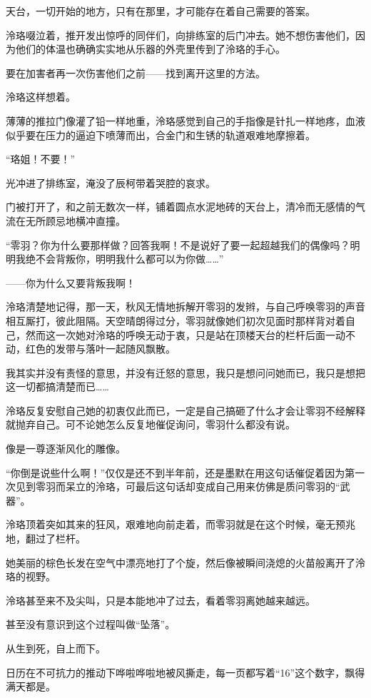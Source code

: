 \documentclass[UTF8, scheme = chinese, openany]{ctexbook}
\begin{document}
天台，一切开始的地方，只有在那里，才可能存在着自己需要的答案。

泠珞啜泣着，推开发出惊呼的同伴们，向排练室的后门冲去。她不想伤害他们，因为他们的体温也确确实实地从乐器的外壳里传到了泠珞的手心。

要在加害者再一次伤害他们之前——找到离开这里的方法。

泠珞这样想着。

薄薄的推拉门像灌了铅一样地重，泠珞感觉到自己的手指像是针扎一样地疼，血液似乎要在压力的逼迫下喷薄而出，合金门和生锈的轨道艰难地摩擦着。

“珞姐！不要！”

光冲进了排练室，淹没了辰柯带着哭腔的哀求。

门被打开了，和之前无数次一样，铺着圆点水泥地砖的天台上，清冷而无感情的气流在无所顾忌地横冲直撞。

\vspace{1.5em}

“零羽？你为什么要那样做？回答我啊！不是说好了要一起超越我们的偶像吗？明明我绝不会背叛你，明明我什么都可以为你做……”

——你为什么又要背叛我啊！

泠珞清楚地记得，那一天，秋风无情地拆解开零羽的发辫，与自己呼唤零羽的声音相互厮打，彼此阻隔。天空晴朗得过分，零羽就像她们初次见面时那样背对着自己，然而这一次她对泠珞的呼唤无动于衷，只是站在顶楼天台的栏杆后面一动不动，红色的发带与落叶一起随风飘散。

我其实并没有责怪的意思，并没有迁怒的意思，我只是想问问她而已，我只是想把这一切都搞清楚而已……

泠珞反复安慰自己她的初衷仅此而已，一定是自己搞砸了什么才会让零羽不经解释就抛弃自己。可不论她怎么反复地催促询问，零羽什么都没有说。

像是一尊逐渐风化的雕像。

“你倒是说些什么啊！”仅仅是还不到半年前，还是墨默在用这句话催促着因为第一次见到零羽而呆立的泠珞，可最后这句话却变成自己用来仿佛是质问零羽的“武器”。

泠珞顶着突如其来的狂风，艰难地向前走着，而零羽就是在这个时候，毫无预兆地，翻过了栏杆。

她美丽的棕色长发在空气中漂亮地打了个旋，然后像被瞬间浇熄的火苗般离开了泠珞的视野。

泠珞甚至来不及尖叫，只是本能地冲了过去，看着零羽离她越来越远。

甚至没有意识到这个过程叫做“坠落”。

从生到死，自上而下。

日历在不可抗力的推动下哗啦哗啦地被风撕走，每一页都写着“16”这个数字，飘得满天都是。
\end{document}
